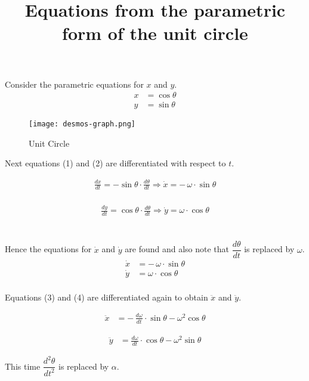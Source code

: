 \documentclass[12pt]{article}
\title{Equations from the parametric form of the unit circle}
\author{\null}
\date{\null}
\begin{document}
\maketitle
Consider the parametric equations for $x$ and $y$.
\\
\begin{align}
x &= \cos \theta \\
y &= \sin \theta 
\end{align}

\begin{figure}[H]
\begin{center}
	\texttt{[image: desmos-graph.png]}
	\caption{Unit Circle}
\end{center}
\end{figure}
Next equations (1) and (2) are differentiated
with respect to $t$.

\begin{align*}
\frac{dx}{dt} = -\sin\theta \cdot \frac{d\theta}{dt} \Longrightarrow \dot{x} = -\, \omega\cdot\sin\theta
\end{align*}
\\
\begin{align*}  
\frac{dy}{dt} = \cos\theta \cdot \frac{d\theta}{dt} \Longrightarrow \dot{y} = \omega\cdot\cos\theta
\end{align*}
\\
\\
Hence the equations for $\dot{x}$ and $\dot{y}$ are found
and also note that $\dfrac{d\theta}{dt}$ is replaced by $\omega$. \\
\begin{align}
\dot{x} &= - \, \omega \cdot \sin \theta \\
\dot{y} &= \omega \cdot \cos \theta 
\end{align}
\\ 
Equations (3) and (4) are differentiated again to obtain $\ddot{x}$ and $\ddot{y}$.

\begin{align*}
\ddot{x} &= - \, \frac{d\omega}{dt} \cdot \sin \theta - \omega^{2} \cos \theta   
\end{align*}

\begin{align*}
\ddot{y} &= \frac{d\omega}{dt} \cdot \cos \theta - \omega^{2}\sin \theta   
\end{align*}

This time $\dfrac{d^{2}\theta}{dt^{2}}$ is replaced by $\alpha$.
\end{document}
